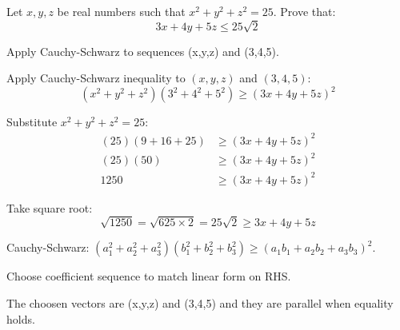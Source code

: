 \begin{problem}
Let $x, y, z$ be real numbers such that $x^2 + y^2 + z^2 = 25$. Prove that:
\[
3x + 4y + 5z \le 25\sqrt{2}
\]
\end{problem}

\begin{hint}
Apply Cauchy-Schwarz to sequences (x,y,z) and (3,4,5).
\end{hint}

\begin{solution}
Apply Cauchy-Schwarz inequality to $(x, y, z)$ and $(3, 4, 5)$:
\[ (x^2 + y^2 + z^2)(3^2 + 4^2 + 5^2) \geq (3x + 4y + 5z)^2 \]

Substitute $x^2 + y^2 + z^2 = 25$:
\begin{align*}
(25)(9 + 16 + 25) &\geq (3x + 4y + 5z)^2 \\
(25)(50) &\geq (3x + 4y + 5z)^2 \\
1250 &\geq (3x + 4y + 5z)^2
\end{align*}

Take square root:
\[ \sqrt{1250} = \sqrt{625 \times 2} = 25\sqrt{2} \geq 3x + 4y + 5z \]
\end{solution}

\begin{takeaways}
\item Cauchy-Schwarz: $(a_1^2 + a_2^2 + a_3^2)(b_1^2 + b_2^2 + b_3^2) \geq (a_1b_1 + a_2b_2 + a_3b_3)^2$.
\item Choose coefficient sequence to match linear form on RHS.
\item The choosen vectors are (x,y,z) and (3,4,5) and they are parallel when equality holds.
\item 
\end{takeaways}
